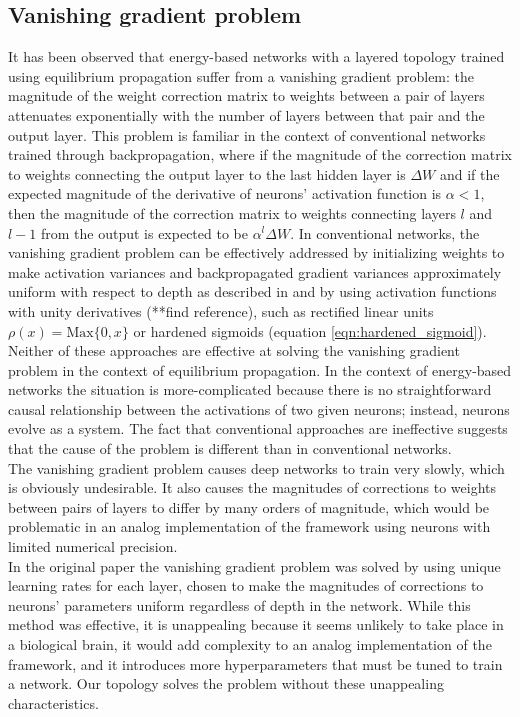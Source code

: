 \documentclass{article}
\newcommand{\npar}{\\\indent}
\begin{document}
\subsection{Vanishing gradient problem}
\label{sec:vangrad}

It has been observed \cite{scellier17} that energy-based networks with a layered topology trained using equilibrium propagation suffer from a vanishing gradient problem: the magnitude of the weight correction matrix to weights between a pair of layers attenuates exponentially with the number of layers between that pair and the output layer. This problem is familiar in the context of conventional networks trained through backpropagation, where if the magnitude of the correction matrix to weights connecting the output layer to the last hidden layer is $\Delta W$ and if the expected magnitude of the derivative of neurons' activation function is $\alpha<1$, then the magnitude of the correction matrix to weights connecting layers $l$ and $l-1$ from the output is expected to be $\alpha^l\Delta W$. In conventional networks, the vanishing gradient problem can be effectively addressed by initializing weights to make activation variances and backpropagated gradient variances approximately uniform with respect to depth as described in \cite{glorot2010} and by using activation functions with unity derivatives (**find reference), such as rectified linear units $\rho(x)=\text{Max}\{0, x\}$ or hardened sigmoids (equation \ref{eqn:hardened_sigmoid}).
\npar
Neither of these approaches are effective at solving the vanishing gradient problem in the context of equilibrium propagation. In the context of energy-based networks the situation is more-complicated because there is no straightforward causal relationship between the activations of two given neurons; instead, neurons evolve as a system. The fact that conventional approaches are ineffective suggests that the cause of the problem is different than in conventional networks.
\npar
The vanishing gradient problem causes deep networks to train very slowly, which is obviously undesirable. It also causes the magnitudes of corrections to weights between pairs of layers to differ by many orders of magnitude, which would be problematic in an analog implementation of the framework using neurons with limited numerical precision.
\npar
In the original paper the vanishing gradient problem was solved by using unique learning rates for each layer, chosen to make the magnitudes of corrections to neurons' parameters uniform regardless of depth in the network. While this method was effective, it is unappealing because it seems unlikely to take place in a biological brain, it would add complexity to an analog implementation of the framework, and it introduces more hyperparameters that must be tuned to train a network. Our topology solves the problem without these unappealing characteristics.
\end{document}

